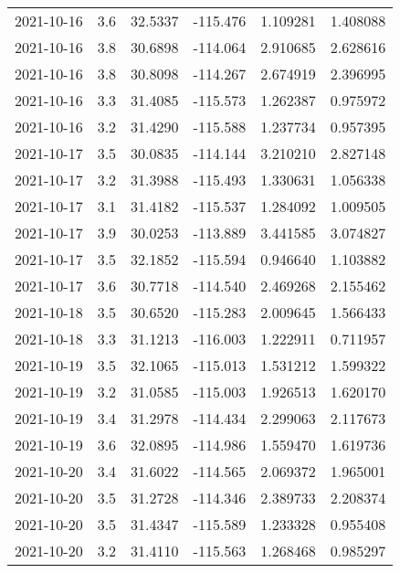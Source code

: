 \begin{tabular}{lrrrrr}
2021-10-16 &       3.6 &  32.5337 &  -115.476 &         1.109281 &         1.408088 \\
2021-10-16 &       3.8 &  30.6898 &  -114.064 &         2.910685 &         2.628616 \\
2021-10-16 &       3.8 &  30.8098 &  -114.267 &         2.674919 &         2.396995 \\
2021-10-16 &       3.3 &  31.4085 &  -115.573 &         1.262387 &         0.975972 \\
2021-10-16 &       3.2 &  31.4290 &  -115.588 &         1.237734 &         0.957395 \\
2021-10-17 &       3.5 &  30.0835 &  -114.144 &         3.210210 &         2.827148 \\
2021-10-17 &       3.2 &  31.3988 &  -115.493 &         1.330631 &         1.056338 \\
2021-10-17 &       3.1 &  31.4182 &  -115.537 &         1.284092 &         1.009505 \\
2021-10-17 &       3.9 &  30.0253 &  -113.889 &         3.441585 &         3.074827 \\
2021-10-17 &       3.5 &  32.1852 &  -115.594 &         0.946640 &         1.103882 \\
2021-10-17 &       3.6 &  30.7718 &  -114.540 &         2.469268 &         2.155462 \\
2021-10-18 &       3.5 &  30.6520 &  -115.283 &         2.009645 &         1.566433 \\
2021-10-18 &       3.3 &  31.1213 &  -116.003 &         1.222911 &         0.711957 \\
2021-10-19 &       3.5 &  32.1065 &  -115.013 &         1.531212 &         1.599322 \\
2021-10-19 &       3.2 &  31.0585 &  -115.003 &         1.926513 &         1.620170 \\
2021-10-19 &       3.4 &  31.2978 &  -114.434 &         2.299063 &         2.117673 \\
2021-10-19 &       3.6 &  32.0895 &  -114.986 &         1.559470 &         1.619736 \\
2021-10-20 &       3.4 &  31.6022 &  -114.565 &         2.069372 &         1.965001 \\
2021-10-20 &       3.5 &  31.2728 &  -114.346 &         2.389733 &         2.208374 \\
2021-10-20 &       3.5 &  31.4347 &  -115.589 &         1.233328 &         0.955408 \\
2021-10-20 &       3.2 &  31.4110 &  -115.563 &         1.268468 &         0.985297 \\

\end{tabular}
